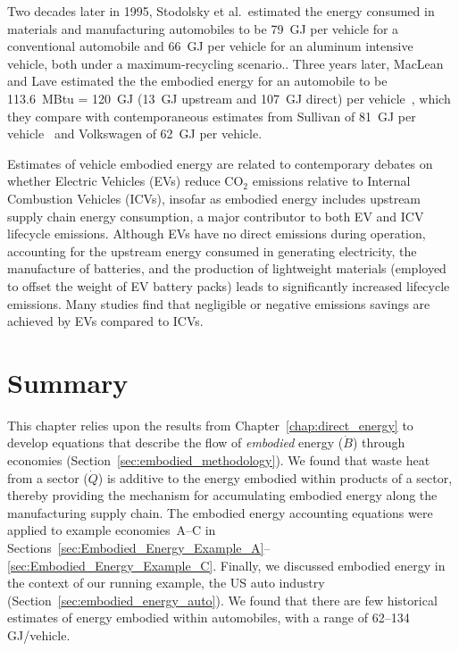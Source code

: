 Two decades later in 1995, Stodolsky et al.\ estimated the energy consumed in materials and 
manufacturing automobiles to be 79~GJ per vehicle for a conventional automobile and 66~GJ per vehicle
for an aluminum intensive vehicle, both under a maximum-recycling
scenario.\cite[p.11]{Stodolsky1995}. 
Three years later, MacLean and Lave estimated the the embodied energy
for an automobile to be 113.6~MBtu = 120~GJ 
(13~GJ upstream and 107~GJ direct)
per vehicle~\cite[Figure~2]{MacLean1998}, 
which they compare with
contemporaneous estimates from Sullivan of 81~GJ per 
vehicle~\cite{Sullivan1995} and Volkswagen of 62~GJ
per vehicle.\cite{Schweimer1996}


Estimates of vehicle embodied energy are related 
to contemporary debates on whether 
Electric Vehicles (EVs) reduce CO$_2$ emissions
relative to Internal Combustion Vehicles (ICVs),
insofar as embodied energy includes upstream supply chain energy consumption,
a major contributor to both EV and ICV lifecycle emissions.
Although EVs have no direct emissions during operation,
accounting for the upstream energy consumed in generating electricity, 
the manufacture of batteries, 
and the production of lightweight materials 
(employed to offset the weight of EV battery packs)
leads to significantly increased lifecycle emissions.
Many studies find that negligible or negative emissions
savings are achieved by EVs compared to
ICVs.\cite{Anair:2012aa, Hawkins2012,zehner2013unclean}


\section{Summary}
\label{sec:embodied_energy_summary}

This chapter relies upon the results from Chapter~\ref{chap:direct_energy} to 
develop equations that describe the flow of 
\emph{embodied} energy ($\dot{B}$) through economies 
(Section~\ref{sec:embodied_methodology}).
We found that waste heat from a sector ($\dot{Q}$)
is additive to the energy embodied within products of a sector, 
thereby providing the mechanism for accumulating embodied energy 
along the manufacturing supply chain.
The embodied energy accounting equations were applied to example
economies~A--C %
in Sections~\ref{sec:Embodied_Energy_Example_A}--\ref{sec:Embodied_Energy_Example_C}. 
Finally, we discussed embodied energy in the context 
of our running example, the US auto industry (Section~\ref{sec:embodied_energy_auto}).
We found that there are few historical estimates of energy embodied within
automobiles, with a range of 62--134 GJ/vehicle.

